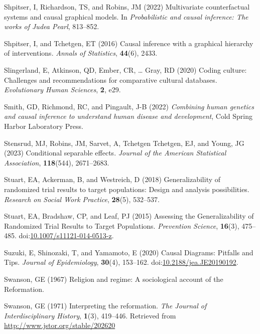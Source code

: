 \documentclass[
  single column]{article}
\newlength{\cslhangindent}
\newenvironment{CSLReferences}[2] %
 {\begin{list}{}{%
  \setlength{\itemindent}{0pt}
  \setlength{\leftmargin}{0pt}
  \setlength{\parsep}{0pt}
  \ifodd #1
   \setlength{\leftmargin}{\cslhangindent}
   \setlength{\itemindent}{-1\cslhangindent}
  \fi
  \setlength{\itemsep}{#2\baselineskip}}}
 {\end{list}}
\begin{document}
\begin{CSLReferences}{1}{0}
Shpitser, I, Richardson, TS, and Robins, JM (2022) Multivariate
counterfactual systems and causal graphical models. In
\emph{Probabilistic and causal inference: The works of {J}udea {P}earl},
813--852.

Shpitser, I, and Tchetgen, ET (2016) Causal inference with a graphical
hierarchy of interventions. \emph{Annals of Statistics}, \textbf{44}(6),
2433.

Slingerland, E, Atkinson, QD, Ember, CR, \ldots{} Gray, RD (2020) Coding
culture: Challenges and recommendations for comparative cultural
databases. \emph{Evolutionary Human Sciences}, \textbf{2}, e29.

Smith, GD, Richmond, RC, and Pingault, J-B (2022) \emph{Combining human
genetics and causal inference to understand human disease and
development}, Cold Spring Harbor Laboratory Press.

Stensrud, MJ, Robins, JM, Sarvet, A, Tchetgen Tchetgen, EJ, and Young,
JG (2023) Conditional separable effects. \emph{Journal of the American
Statistical Association}, \textbf{118}(544), 2671--2683.

Stuart, EA, Ackerman, B, and Westreich, D (2018) Generalizability of
randomized trial results to target populations: Design and analysis
possibilities. \emph{Research on Social Work Practice}, \textbf{28}(5),
532--537.

Stuart, EA, Bradshaw, CP, and Leaf, PJ (2015) Assessing the
Generalizability of Randomized Trial Results to Target Populations.
\emph{Prevention Science}, \textbf{16}(3), 475--485.
doi:\href{https://doi.org/10.1007/s11121-014-0513-z}{10.1007/s11121-014-0513-z}.

Suzuki, E, Shinozaki, T, and Yamamoto, E (2020) Causal Diagrams:
Pitfalls and Tips. \emph{Journal of Epidemiology}, \textbf{30}(4),
153--162.
doi:\href{https://doi.org/10.2188/jea.JE20190192}{10.2188/jea.JE20190192}.

Swanson, GE (1967) Religion and regime: A sociological account of the
{R}eformation.

Swanson, GE (1971) Interpreting the reformation. \emph{The Journal of
Interdisciplinary History}, \textbf{1}(3), 419--446. Retrieved from
\url{http://www.jstor.org/stable/202620}


\end{CSLReferences}
\end{document}
